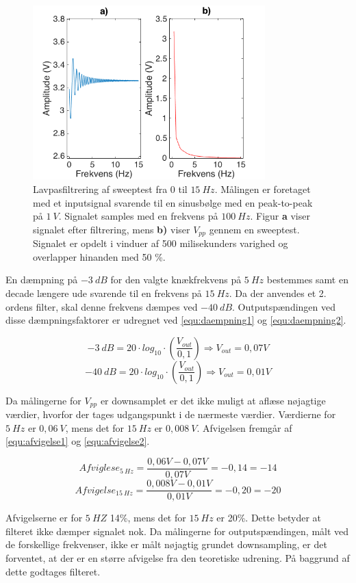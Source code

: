 \begin{figure}[H]
\centering
\includegraphics[width=0.8\textwidth]{figures/Lavpass_test}
\caption{Lavpasfiltrering af sweeptest fra 0 til $15~Hz$. Målingen er foretaget med et inputsignal svarende til en sinusbølge med en peak-to-peak på $1~V$. Signalet samples med en frekvens på $100~Hz$. Figur \textbf{a} viser signalet efter filtrering, mens \textbf{b)} viser $V_{pp}$ gennem en sweeptest. Signalet er opdelt i vinduer af 500 milisekunders varighed og overlapper hinanden med 50 \%.}
\label{fig:lavps_sweep}
\end{figure}


En dæmpning på $-3~dB$ for den valgte knækfrekvens på $5~Hz$ bestemmes samt en decade længere ude svarende til en frekvens på $15~Hz$. Da der anvendes et 2. ordens filter, skal denne frekvens dæmpes ved $-40~dB$. Outputspændingen ved disse dæmpningsfaktorer er udregnet ved \autoref{equ:daempning1} og \autoref{equ:daempning2}. 

\begin{equation} \label{equ:daempning1}
-3~dB = 20 \cdot log_{10} \cdot (\frac{V_{out}}{0,1}) \Rightarrow V_{out} = 0,07 V
\end{equation}
\begin{equation} \label{equ:daempning2}
-40~dB = 20 \cdot log_{10} \cdot (\frac{V_{out}}{0,1}) \Rightarrow V_{out} = 0,01 V
\end{equation}

\noindent
Da målingerne for $V_{pp}$ er downsamplet er det ikke muligt at aflæse nøjagtige værdier, hvorfor der tages udgangspunkt i de nærmeste værdier. Værdierne for $5~Hz$ er $0,06~V$, mens det for $15~Hz$ er $0,008~V$. Afvigelsen fremgår af \autoref{equ:afvigelse1} og \autoref{equ:afvigelse2}.


\begin{equation} \label{equ:afvigelse1}
Afviglese_{5~Hz} = \frac{0,06V-0,07V}{0,07V} = -0,14  = - 14%
\end{equation}
\begin{equation} \label{equ:afvigelse2}
Afvigelse_{15~Hz} = \frac{0,008V-0,01V}{0,01V} = -0,20  = -20%
\end{equation}

\noindent 
Afvigelserne er for $5~HZ$ 14\%, mens det for $15~Hz$ er 20\%. Dette betyder at filteret ikke dæmper signalet nok. Da målingerne for outputspændingen, målt ved de forskellige frekvenser, ikke er målt nøjagtig grundet downsampling, er det forventet, at der er en større afvigelse fra den teoretiske udrening. På baggrund af dette godtages filteret. 
